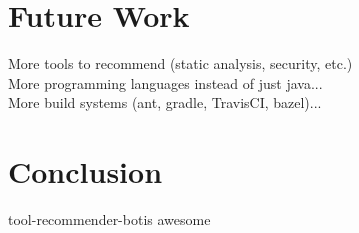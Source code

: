 \documentclass[conference]{IEEEtran}
\newcommand{\tool}{tool-recommender-bot}
\begin{document}
\section{Future Work}

More tools to recommend (static analysis, security, etc.) \\

More programming languages instead of just java...\\

More build systems (ant, gradle, TravisCI, bazel)...\\

\section{Conclusion}

\tool is awesome




  
%

\end{document}
